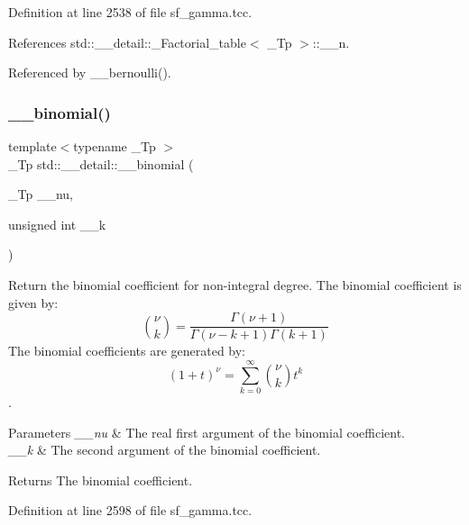 Definition at line 2538 of file sf\+\_\+gamma.\+tcc.



References std\+::\+\_\+\+\_\+detail\+::\+\_\+\+Factorial\+\_\+table$<$ \+\_\+\+Tp $>$\+::\+\_\+\+\_\+n.



Referenced by \+\_\+\+\_\+bernoulli().

\mbox{\label{namespacestd_1_1____detail_a9ac7d44eebfe3e1a3fb5ebbd9c08bd55}} 
\subsubsection{\texorpdfstring{\+\_\+\+\_\+binomial()}{\_\_binomial()}\hspace{0.1cm}{\footnotesize\ttfamily [2/2]}}
{\footnotesize\ttfamily template$<$typename \+\_\+\+Tp $>$ \\
\+\_\+\+Tp std\+::\+\_\+\+\_\+detail\+::\+\_\+\+\_\+binomial (\begin{DoxyParamCaption}\item[{\+\_\+\+Tp}]{\+\_\+\+\_\+nu,  }\item[{unsigned int}]{\+\_\+\+\_\+k }\end{DoxyParamCaption})}



Return the binomial coefficient for non-\/integral degree. The binomial coefficient is given by\+: \[ \binom{\nu}{k} = \frac{\Gamma(\nu+1)}{\Gamma(\nu-k+1) \Gamma(k+1)} \] The binomial coefficients are generated by\+: \[ \left(1 + t\right)^\nu = \sum_{k=0}^\infty \binom{\nu}{k} t^k \]. 


\begin{DoxyParams}{Parameters}
{\em \+\_\+\+\_\+nu} & The real first argument of the binomial coefficient. \\
\hline
{\em \+\_\+\+\_\+k} & The second argument of the binomial coefficient. \\
\hline
\end{DoxyParams}
\begin{DoxyReturn}{Returns}
The binomial coefficient. 
\end{DoxyReturn}


Definition at line 2598 of file sf\+\_\+gamma.\+tcc.



